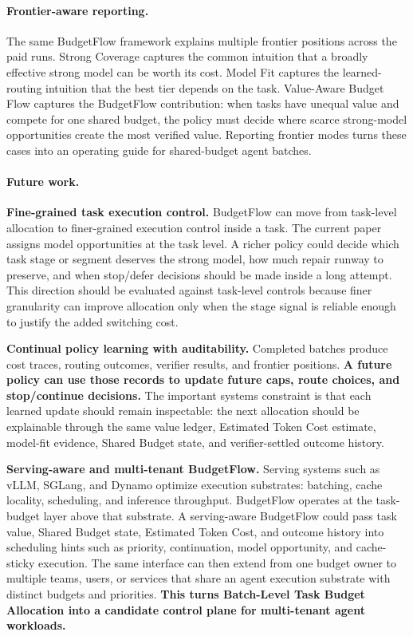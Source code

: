 \documentclass[sigconf,review,anonymous]{acmart}
\newcommand{\method}{BudgetFlow\xspace}
\newcommand{\tokencost}{Estimated Token Cost\xspace}
\newcommand{\sharedbudget}{Shared Budget\xspace}
\begin{document}
\paragraph{Frontier-aware reporting.}
The same \method framework explains multiple frontier positions across the paid runs. Strong Coverage captures the common intuition that a broadly effective strong model can be worth its cost. Model Fit captures the learned-routing intuition that the best tier depends on the task. Value-Aware Budget Flow captures the \method contribution: when tasks have unequal value and compete for one shared budget, the policy must decide where scarce strong-model opportunities create the most verified value. Reporting frontier modes turns these cases into an operating guide for shared-budget agent batches.

\paragraph{Future work.}
\textbf{Fine-grained task execution control.} \method can move from task-level allocation to finer-grained execution control inside a task. The current paper assigns model opportunities at the task level. A richer policy could decide which task stage or segment deserves the strong model, how much repair runway to preserve, and when stop/defer decisions should be made inside a long attempt. This direction should be evaluated against task-level controls because finer granularity can improve allocation only when the stage signal is reliable enough to justify the added switching cost.

\textbf{Continual policy learning with auditability.} Completed batches produce cost traces, routing outcomes, verifier results, and frontier positions. \textbf{A future policy can use those records to update future caps, route choices, and stop/continue decisions.} The important systems constraint is that each learned update should remain inspectable: the next allocation should be explainable through the same value ledger, \tokencost estimate, model-fit evidence, \sharedbudget state, and verifier-settled outcome history.

\textbf{Serving-aware and multi-tenant BudgetFlow.} Serving systems such as vLLM, SGLang, and Dynamo optimize execution substrates: batching, cache locality, scheduling, and inference throughput. \method operates at the task-budget layer above that substrate. A serving-aware BudgetFlow could pass task value, \sharedbudget state, \tokencost, and outcome history into scheduling hints such as priority, continuation, model opportunity, and cache-sticky execution. The same interface can then extend from one budget owner to multiple teams, users, or services that share an agent execution substrate with distinct budgets and priorities. \textbf{This turns Batch-Level Task Budget Allocation into a candidate control plane for multi-tenant agent workloads.}
\end{document}

